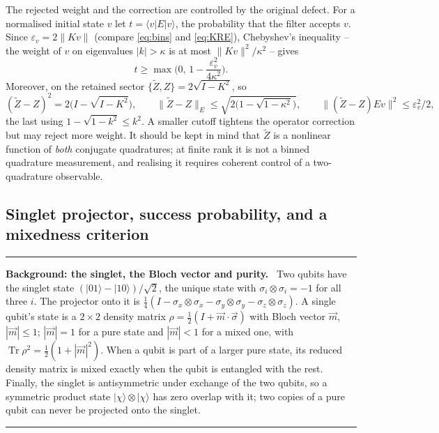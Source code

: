 \documentclass[11pt,a4paper]{article}
\newcommand{\Tr}{\operatorname{Tr}}
\newcommand{\ket}[1]{|#1\rangle}
\newcommand{\bra}[1]{\langle#1|}
\newcommand{\Zt}{\widetilde Z}
\newenvironment{background}[1]{\par\medskip\noindent\hrule\smallskip\noindent\textbf{Background: #1.}\ \ignorespaces}{\par\smallskip\noindent\hrule\medskip}
\begin{document}
The rejected weight and the correction are controlled by the original defect. For a normalised initial state $v$ let $t=\bra vE\ket v$, the probability that the filter accepts $v$. Since $\varepsilon_v=2\|Kv\|$ (compare \eqref{eq:bins} and \eqref{eq:KRE}), Chebyshev's inequality -- the weight of $v$ on eigenvalues $|k|>\kappa$ is at most $\|Kv\|^2/\kappa^2$ -- gives
\begin{equation}
t\ge\max\Big(0,\,1-\frac{\varepsilon_v^2}{4\kappa^2}\Big).
\label{eq:tbound}
\end{equation}
Moreover, on the retained sector $\{\Zt,Z\}=2\sqrt{I-K^2}$, so
\begin{equation}
(\Zt-Z)^2=2\big(I-\sqrt{I-K^2}\big),\qquad
\|\Zt-Z\|_{E}\le\sqrt{2\big(1-\sqrt{1-\kappa^2}\big)},\qquad
\|(\Zt-Z)Ev\|^2\le\varepsilon_v^2/2,
\label{eq:corrbound}
\end{equation}
the last using $1-\sqrt{1-k^2}\le k^2$. A smaller cutoff tightens the operator correction but may reject more weight. It should be kept in mind that $\Zt$ is a nonlinear function of \emph{both} conjugate quadratures; at finite rank it is not a binned quadrature measurement, and realising it requires coherent control of a two-quadrature observable.

\subsection{Singlet projector, success probability, and a mixedness criterion}
\label{sec:singlet}

\begin{background}{the singlet, the Bloch vector and purity}
Two qubits have the singlet state $(\ket{01}-\ket{10})/\sqrt2$, the unique state with $\sigma_i\otimes\sigma_i=-1$ for all three $i$. The projector onto it is $\frac14(I-\sigma_x\otimes\sigma_x-\sigma_y\otimes\sigma_y-\sigma_z\otimes\sigma_z)$. A single qubit's state is a $2\times2$ density matrix $\rho=\frac12(I+\vec m\cdot\vec\sigma)$ with Bloch vector $\vec m$, $|\vec m|\le1$; $|\vec m|=1$ for a pure state and $|\vec m|<1$ for a mixed one, with $\Tr\rho^2=\frac12(1+|\vec m|^2)$. When a qubit is part of a larger pure state, its reduced density matrix is mixed exactly when the qubit is entangled with the rest. Finally, the singlet is antisymmetric under exchange of the two qubits, so a symmetric product state $\ket\chi\otimes\ket\chi$ has zero overlap with it; two copies of a pure qubit can never be projected onto the singlet.
\end{background}
\end{document}
